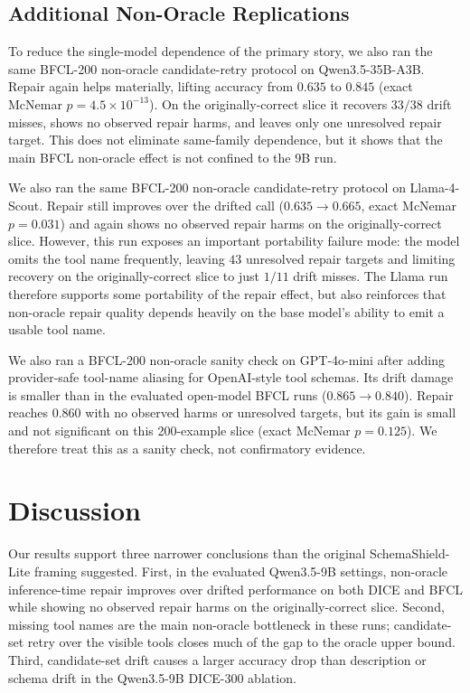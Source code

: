 \documentclass{llncs}
\newcommand{\method}{SchemaShield-Lite\xspace}
\begin{document}
\subsection{Additional Non-Oracle Replications}
\label{sec:additional-replications}
To reduce the single-model dependence of the primary story, we also ran the same
BFCL-200 non-oracle candidate-retry protocol on Qwen3.5-35B-A3B. Repair again
helps materially, lifting accuracy from $0.635$ to $0.845$ (exact McNemar
$p=4.5\times 10^{-13}$). On the originally-correct slice it recovers $33/38$
drift misses, shows no observed repair harms, and leaves only one unresolved
repair target. This does not eliminate same-family dependence, but it shows that
the main BFCL non-oracle effect is not confined to the 9B run.

We also ran the same BFCL-200 non-oracle candidate-retry protocol on
Llama-4-Scout. Repair still improves over the drifted call ($0.635 \rightarrow
0.665$, exact McNemar $p=0.031$) and again shows no observed repair harms on the
originally-correct slice. However, this run exposes an important portability
failure mode: the model omits the tool name frequently, leaving $43$ unresolved
repair targets and limiting recovery on the originally-correct slice to just
$1/11$ drift misses. The Llama run therefore supports some portability of the
repair effect, but also reinforces that non-oracle repair quality depends heavily
on the base model's ability to emit a usable tool name.

We also ran a BFCL-200 non-oracle sanity check on GPT-4o-mini after adding
provider-safe tool-name aliasing for OpenAI-style tool schemas. Its drift damage
is smaller than in the evaluated open-model BFCL runs ($0.865 \rightarrow 0.840$).
Repair reaches $0.860$ with no observed harms or unresolved targets, but its gain
is small and not significant on this 200-example slice (exact McNemar $p=0.125$).
We therefore treat this as a sanity check, not confirmatory evidence.

\section{Discussion}
Our results support three narrower conclusions than the original \method framing
suggested. First, in the evaluated Qwen3.5-9B settings, non-oracle inference-time
repair improves over drifted performance on both DICE and BFCL while showing no
observed repair harms on the originally-correct slice. Second, missing tool names
are the main non-oracle bottleneck in these runs; candidate-set retry over the
visible tools closes much of the gap to the oracle upper bound. Third, candidate-set
drift causes a larger accuracy drop than description or schema drift in the
Qwen3.5-9B DICE-300 ablation.
\end{document}
